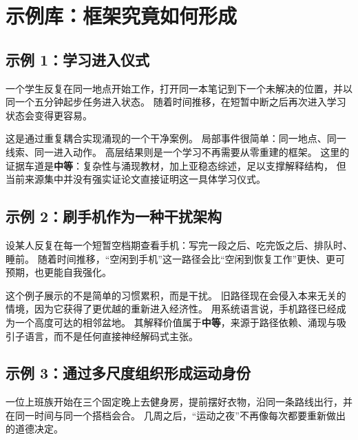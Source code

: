 \section{示例库：框架究竟如何形成}

\subsection{示例 1：学习进入仪式}

\begin{example}[重复进入线索制造廉价的重新进入]
一个学生反复在同一地点开始工作，打开同一本笔记到下一个未解决的位置，并以同一个五分钟起步任务进入状态。
随着时间推移，在短暂中断之后再次进入学习状态会变得更容易。
\end{example}

\begin{discussion}
这是通过重复耦合实现涌现的一个干净案例。
局部事件很简单：同一地点、同一线索、同一进入动作。
高层结果则是一个学习不再需要从零重建的框架。
这里的证据车道是\textbf{中等}：复杂性与涌现教材，加上亚稳态综述，足以支撑解释结构，
但当前来源集中并没有强实证论文直接证明这一具体学习仪式。
\end{discussion}

\subsection{示例 2：刷手机作为一种干扰架构}

\begin{example}[竞争路径获得历史优先权]
设某人反复在每一个短暂空档期查看手机：写完一段之后、吃完饭之后、排队时、睡前。
随着时间推移，“空闲到手机”这一路径会比“空闲到恢复工作”更快、更可预期，也更能自我强化。
\end{example}

\begin{discussion}
这个例子展示的不是简单的习惯累积，而是干扰。
旧路径现在会侵入本来无关的情境，因为它获得了更优越的重新进入经济性。
用系统语言说，手机路径已经成为一个高度可达的相邻盆地。
其解释价值属于\textbf{中等}，来源于路径依赖、涌现与吸引子语言，而不是任何直接神经解码式主张。
\end{discussion}

\subsection{示例 3：通过多尺度组织形成运动身份}

\begin{example}
一位上班族开始在三个固定晚上去健身房，提前摆好衣物，沿同一条路线出行，并在同一时间与同一个搭档会合。
几周之后，“运动之夜”不再像每次都要重新做出的道德决定。
\end{example}

